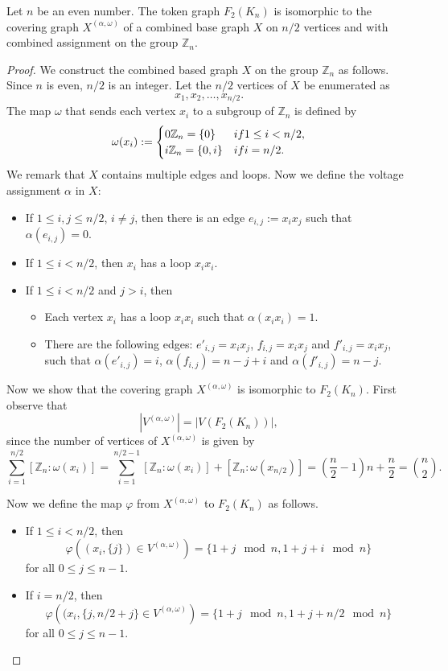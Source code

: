 \documentclass[10pt,a4paper]{amsart}
\newcommand{\G}{X}
\begin{document}
\begin{theorem} \label{theo_1}
Let $n$ be an even number. 
The token graph $F_2(K_n)$ is isomorphic to the covering graph $\G^{(\alpha,\omega)}$ of a combined base graph $\G$ on $n/2$ vertices and with combined assignment on the group $\mathbb{Z}_{n}$.
\end{theorem}

\begin{proof}
We construct the combined based graph $\G$ on the group $\mathbb{Z}_{n}$ as follows. 
Since $n$ is even, $n/2$ is an integer. 
Let the $n/2$ vertices of $X$ be enumerated as
\[
x_1,x_2,\dots,x_{n/2}.
\]
The map $\omega$ that sends each vertex $x_i$ to a subgroup of $\mathbb{Z}_n$  is defined by 
\[
	\omega(x_i):=
	\begin{cases}
        0\mathbb{Z}_n=\{0\} & \textnormal{ if }  1\leq i < n/2, \\
		i\mathbb{Z}_n =\{0,i\} & \textnormal{ if }  i=n/2.
	\end{cases}
  \]  
 We remark that $\G$ contains multiple edges and loops. Now we define the voltage assignment $\alpha$ in $\G$: 
\begin{itemize}
    \item If $1\leq i,j\leq n/2$, $i\neq j$, then there is an edge $e_{i,j}:=x_ix_j$ such that $\alpha(e_{i,j})=0$.
    \item If $1\leq i < n/2$, then $x_i$ has a loop $x_ix_i$.
    \item If $1\leq i < n/2$ and $j>i$, then
    \begin{itemize}
        \item Each vertex $x_i$ has a loop $x_ix_i$ such that $\alpha(x_ix_i)=1$.
        \item There are the following edges: $e'_{i,j}=x_ix_j$, $f_{i,j}=x_ix_j$ and $f'_{i,j}=x_ix_j$, such that $\alpha(e'_{i,j})=i$, $\alpha(f_{i,j})=n-j+i$ and $\alpha (f'_{i,j})=n-j$.
    \end{itemize}
\end{itemize}
 
 Now we show that the covering graph $\G^{(\alpha,\omega)}$ is isomorphic to $F_{2}(K_n)$. 
 First observe that 
 \[|V^{(\alpha,\omega)}|=|V(F_2(K_n))|,\]
 since the number of vertices of $\G^{(\alpha,\omega)}$ is given by
\[
\sum_{i=1}^{n/2}[\mathbb{Z}_n:\omega(x_i)]= \sum_{i=1}^{n/2-1}[\mathbb{Z}_n:\omega(x_i)]+ [\mathbb{Z}_n:\omega(x_{n/2})]=\left(\frac{n}{2}-1\right)n+\frac{n}{2}=\binom{n}{2}.
\]

Now we define the map $\varphi$ from $\G^{(\alpha,\omega)}$ to $F_{2}({K_n})$ as follows.
\begin{itemize}
    \item If $ 1\leq i< n/2$, then
\[
\varphi\left((x_i,\{j\})\in V^{(\alpha,\omega)}\right)= \{1+j\mod{n},1+j+i \mod{n}\}%
\]
for all $0\leq j\leq n-1$.
    \item If $i=n/2$, then 
 \[
\varphi\left((x_{i},\{j,n/2+j\}\in V^{(\alpha,\omega)}\right)= \{1+j \mod{n},1+j+n/2 \mod{n}\}%
 \]
 for all  $0\leq j\leq n-1$.
\end{itemize}


\end{proof}
\end{document}
